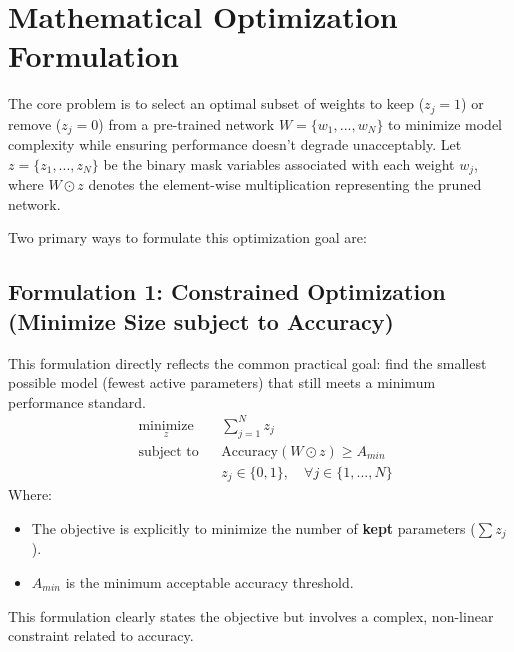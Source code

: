 \documentclass[10pt, article]{article} %
\begin{document}
\section{Mathematical Optimization Formulation}
The core problem is to select an optimal subset of weights to keep ($z_j=1$) or remove ($z_j=0$) from a pre-trained network $W = \{w_1, ..., w_N\}$ to minimize model complexity while ensuring performance doesn't degrade unacceptably. Let $z = \{z_1, ..., z_N\}$ be the binary mask variables associated with each weight $w_j$, where $W \odot z$ denotes the element-wise multiplication representing the pruned network.

Two primary ways to formulate this optimization goal are:

\subsection{Formulation 1: Constrained Optimization (Minimize Size subject to Accuracy)}
This formulation directly reflects the common practical goal: find the smallest possible model (fewest active parameters) that still meets a minimum performance standard.
\begin{equation} \label{eq:constrained_opt}
\begin{aligned}
& \underset{z}{\text{minimize}}
& & \sum_{j=1}^{N} z_j \\
& \text{subject to}
& & \text{Accuracy}(W \odot z) \ge A_{min} \\
& & & z_j \in \{0, 1\}, \quad \forall j \in \{1, ..., N\}
\end{aligned}
\end{equation}
Where:
\begin{itemize}
    \item The objective is explicitly to minimize the number of \textbf{kept} parameters ($\sum z_j$).
    \item $A_{min}$ is the minimum acceptable accuracy threshold.
\end{itemize}
This formulation clearly states the objective but involves a complex, non-linear constraint related to accuracy.
\end{document}
